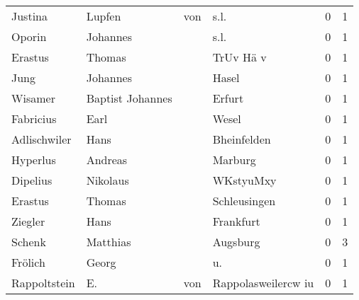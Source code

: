 \begin{tabular}{llllrr}
                  Justina &                             Lupfen &         von &                                        s.l. &          0 &         1 \\
                   Oporin &                           Johannes &             &                                        s.l. &          0 &         1 \\
                  Erastus &                             Thomas &             &                                   TrUv Hä v &          0 &         1 \\
                     Jung &                           Johannes &             &                                       Hasel &          0 &         1 \\
                  Wisamer &                   Baptist Johannes &             &                                      Erfurt &          0 &         1 \\
                Fabricius &                               Earl &             &                                       Wesel &          0 &         1 \\
             Adlischwiler &                               Hans &             &                                 Bheinfelden &          0 &         1 \\
                 Hyperlus &                            Andreas &             &                                     Marburg &          0 &         1 \\
                 Dipelius &                           Nikolaus &             &                                   WKstyuMxy &          0 &         1 \\
                  Erastus &                             Thomas &             &                                Schleusingen &          0 &         1 \\
                  Ziegler &                               Hans &             &                                   Frankfurt &          0 &         1 \\
                   Schenk &                           Matthias &             &                                    Augsburg &          0 &         3 \\
                  Frölich &                              Georg &             &                                         u.  &          0 &         1 \\
             Rappoltstein &                                 E. &         von &                         Rappolasweilercw iu &          0 &         1 \\

\end{tabular}
